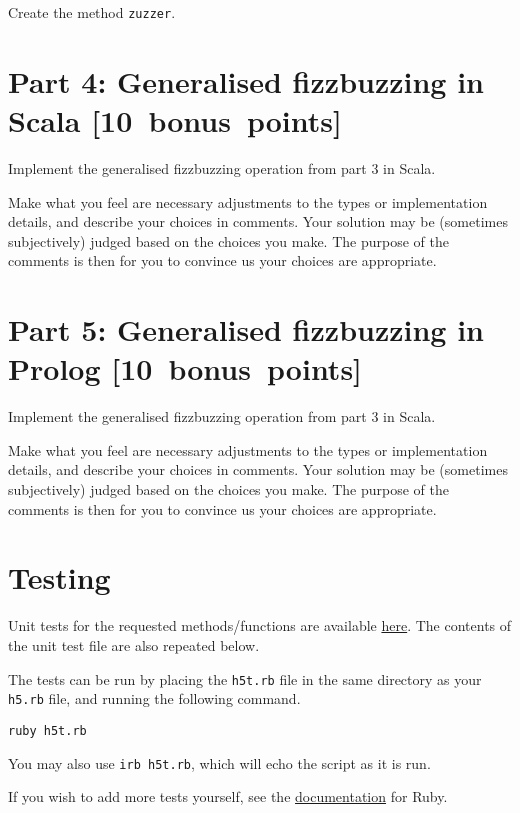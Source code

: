 \documentclass[11pt]{article}
\begin{document}
Create the method \texttt{zuzzer}.

\section*{Part 4: Generalised fizzbuzzing in Scala                [10 bonus points]}
\label{sec:org366a639}
Implement the generalised fizzbuzzing operation from part 3 in Scala.

Make what you feel are necessary adjustments to the types or
implementation details, and describe your choices in comments.
Your solution may be (sometimes subjectively) judged based on
the choices you make. The purpose of the comments is then
for you to convince us your choices are appropriate.

\section*{Part 5: Generalised fizzbuzzing in Prolog               [10 bonus points]}
\label{sec:orge933a30}
Implement the generalised fizzbuzzing operation from part 3 in Scala.

Make what you feel are necessary adjustments to the types or
implementation details, and describe your choices in comments.
Your solution may be (sometimes subjectively) judged based on
the choices you make. The purpose of the comments is then
for you to convince us your choices are appropriate.

\section*{Testing}
\label{sec:org7074c90}
Unit tests for the requested methods/functions
are available \href{./testing/h5/h5t.rb}{here}.
The contents of the unit test file are also repeated below.

The tests can be run by placing the \texttt{h5t.rb} file
in the same directory as your \texttt{h5.rb} file, and
running the following command.
\begin{verbatim}
ruby h5t.rb
\end{verbatim}
You may also use \texttt{irb h5t.rb}, which will echo the script
as it is run.

If you wish to add more tests yourself,
see the \href{https://en.wikibooks.org/wiki/Ruby\_Programming/Unit\_testing}{documentation}
for Ruby.
\end{document}
